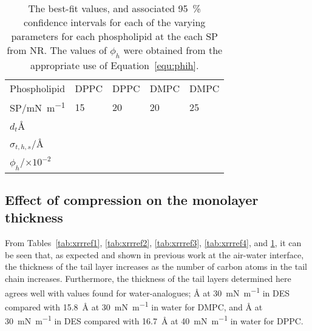 \begin{table}[t]
    \centering
    \small
    \caption{The best-fit values, and associated \SI{95}{\percent} confidence intervals for each of the varying parameters for each phospholipid at the each SP from NR. The values of $\phi_h$ were obtained from the appropriate use of Equation~\protect\ref{equ:phih}.}
    \label{tab:nrref}
    \begin{tabular}{l | l l l l}
        \toprule
        Phospholipid & DPPC & DPPC & DMPC & DMPC \\
        SP/\si{\milli\newton\per\meter} & 15 & 20 & 20 & 25 \\
        \midrule
        $d_t$\si{\angstrom} &  &  &  &  \\
        $\sigma_{t,h,s}$/\si{\angstrom} &  &  &  &  \\
        \midrule
        $\phi_h$/$\times 10^{-2}$ &  &  &  &  \\
        \bottomrule
    \end{tabular}
\end{table}
%

\subsection{Effect of compression on the monolayer thickness}
From Tables~\ref{tab:xrrref1}, \ref{tab:xrrref2}, \ref{tab:xrrref3}, \ref{tab:xrrref4}, and \ref{tab:nrref}, it can be seen that, as expected and shown in previous work at the air-water interface,\autocite{mohwald_phospholipid_1990,vaknin_structural_1991} the thickness of the tail layer increases as the number of carbon atoms in the tail chain increases.
Furthermore, the thickness of the tail layers determined here agrees well with values found for water-analogues; \si{\angstrom} at \SI{30}{\milli\newton\per\meter} in DES compared with \SI{15.8}{\angstrom} at \SI{30}{\milli\newton\per\meter} in water for DMPC, and \si{\angstrom} at \SI{30}{\milli\newton\per\meter} in DES compared with \SI{16.7}{\angstrom} at \SI{40}{\milli\newton\per\meter} in water for DPPC.

